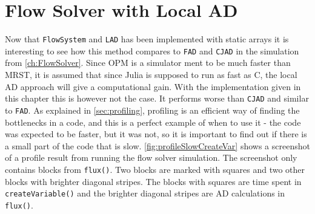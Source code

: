 \section{Flow Solver with Local AD}
\label{sec:flowSolverWithLAD}
Now that \texttt{FlowSystem} and \texttt{LAD} has been implemented with static arrays it is interesting to see how this method compares to \texttt{FAD} and \texttt{CJAD} in the simulation from \autoref{ch:FlowSolver}. Since OPM is a simulator ment to be much faster than MRST, it is assumed that since Julia is supposed to run as fast as C, the local AD approach will give a computational gain. With the implementation given in this chapter this is however not the case. It performs worse than \texttt{CJAD} and similar to \texttt{FAD}. As explained in \autoref{sec:profiling}, profiling is an efficient way of finding the bottlenecks in a code, and this is a perfect example of when to use it - the code was expected to be faster, but it was not, so it is important to find out if there is a small part of the code that is slow. \autoref{fig:profileSlowCreateVar} shows a screenshot of a profile result from running the flow solver simulation. The screenshot only contains blocks from \texttt{flux()}. Two blocks are marked with squares and two other blocks with brighter diagonal stripes. The blocks with squares are time spent in \texttt{createVariable()} and the brighter diagonal stripes are AD calculations in \texttt{flux()}.
